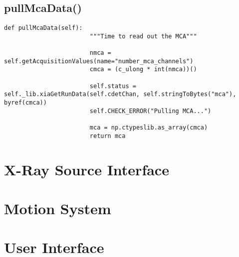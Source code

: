             \subsection{pullMcaData()}
                \begin{lstlisting}[style=mypython, firstnumber=271, caption={[XMagix method pullMcaData()]XMagix method pullMcaData().}, label={lst:xmagix pullMcaData}, gobble=16]
                    def pullMcaData(self):
                        """Time to read out the MCA"""
                        
                        nmca = self.getAcquisitionValues(name="number_mca_channels")
                        cmca = (c_ulong * int(nmca))()
                
                        self.status = self._lib.xiaGetRunData(self.cdetChan, self.stringToBytes("mca"), byref(cmca))
                        self.CHECK_ERROR("Pulling MCA...")
                
                        mca = np.ctypeslib.as_array(cmca)
                        return mca
                \end{lstlisting}

                    
    \section{X-Ray Source Interface}
        \lipsum
    \section{Motion System}
        \lipsum
    \section{User Interface}
        \lipsum
